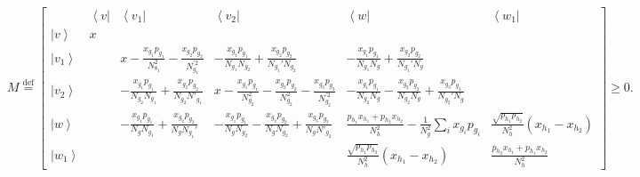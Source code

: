 \documentclass{theoretics}
\begin{document}
\noindent
{\footnotesize%
	\begin{minipage}[t]{1\columnwidth}%
		\begin{displaymath}
		M\overset{\text{def}}{=}\left[\begin{array}{c|ccccc}
		& \left\langle v\right| & \left\langle v_{1}\right| & \left\langle v_{2}\right| & \left\langle w\right| & \left\langle w_{1}\right|\\
		\hline \left|v\right\rangle  & x\\
		\left|v_{1}\right\rangle  &  & x-\frac{x_{g_{1}}p_{g_{1}}}{N_{8_{1}}^{2}}-\frac{x_{g_{2}}p_{g_{2}}}{N_{g_{1}}^{\prime2}} & -\frac{x_{g_{1}}p_{g_{1}}}{N_{g_{1}}N_{g_{2}}}+\frac{x_{g_{2}}p_{g_{2}}}{N_{g_{1}}'N_{g_{2}}} & -\frac{x_{g_{1}}p_{g_{1}}}{N_{g_{1}}N_{g}}+\frac{x_{g_{2}}p_{g_{2}}}{N_{g_{1}}'N_{g}}\\
		\left|v_{2}\right\rangle  &  & -\frac{x_{g_{1}}p_{g_{1}}}{N_{g_{2}}N_{g_{1}}}+\frac{x_{g_{2}}p_{g_{2}}}{N_{g_{2}}N'_{g_{1}}} & x-\frac{x_{g_{1}}p_{g_{1}}}{N_{g_{2}}^{2}}-\frac{x_{g_{2}}p_{g_{2}}}{N_{g_{2}}^{2}}-\frac{x_{g_{3}}p_{g_{3}}}{N_{g_{2}}^{\prime2}} & -\frac{x_{g_{1}}p_{g_{1}}}{N_{g_{2}}N_{g}}-\frac{x_{g_{2}}p_{g_{2}}}{N_{g_{2}}N_{g}}+\frac{x_{g_{3}}p_{g_{3}}}{N_{g_{2}}'N_{g}}\\
		\left|w\right\rangle  &  & -\frac{x_{g_{1}}p_{g_{1}}}{N_{g}N_{g_{1}}}+\frac{x_{g_{2}}p_{g_{2}}}{N_{g}N_{g_{1}}'} & -\frac{x_{g_{1}}p_{g_{1}}}{N_{g}N_{g_{2}}}-\frac{x_{g_{2}}p_{g_{2}}}{N_{g}N_{g_{2}}}+\frac{x_{g_{3}}p_{g_{3}}}{N_{g}N'_{g_{2}}} & \frac{p_{h_{1}}x_{h_{1}}+p_{h_{2}}x_{h_{2}}}{N_{h}^{2}}-\frac{1}{N_{g}^{2}}\sum_{i}x_{g_{i}}p_{g_{i}} & \frac{\sqrt{p_{h_{1}}p_{h_{2}}}}{N_{h}^{2}}(x_{h_{1}}-x_{h_{2}})\\
		\left|w_{1}\right\rangle  &  &  &  & \frac{\sqrt{p_{h_{1}}p_{h_{2}}}}{N_{h}^{2}}(x_{h_{1}}-x_{h_{2}}) & \frac{p_{h_{2}}x_{h_{1}}+p_{h_{1}}x_{h_{2}}}{N_{h}^{2}}
		\end{array}\right]\ge0.
		\end{displaymath}
	\end{minipage}
	
}
\end{document}
